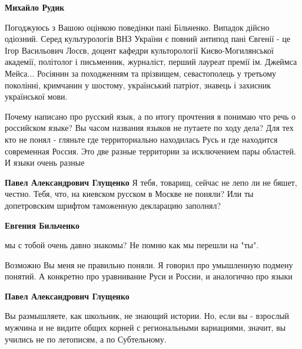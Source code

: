 \begin{itemize}
\begin{itemize}
\textbf{Михайло Рудик} 

Погоджуюсь з Вашою оцінкою поведінки пані Більченко. Випадок дійсно одіозний.
Серед культурологів ВНЗ України є повний антипод пані Євгенії - це Ігор
Васильович Лосєв, доцент кафедри культорології Києво-Могилянської академії,
політолог і письменник, журналіст, перший лауреат премії ім. Джеймса Мейса...
Росіянин за походженням та прізвищем, севастополець у третьому поколінні,
кримчанин у шостому, український патріот, знавець і захисник української мови.


\end{itemize}



Почему написано про русский язык, а по итогу прочтения я понимаю что речь о
российском языке? Вы часом названия языков не путаете по ходу дела? Для тех кто
не понял - гляньте где территориально находилась Русь и где находится
современная Россия. Это две разные территории за исключением пары областей. И
языки очень разные

\begin{itemize}


\textbf{Павел Александрович Глущенко} Я тебя, товарищ, сейчас не лепо ли не
бяшет, честно. Тебя, что, на киевском русском в Москве не поняли? Или ты
допетровским шрифтом таможенную декларацию заполнял?



\textbf{Евгения Бильченко} 

мы с тобой очень давно знакомы? Не помню как мы перешли на "ты".

Возможно Вы меня не правильно поняли. Я говорил про умышленную подмену понятий.
А конкретно про уравнивание Руси и России, и аналогично про языки



\textbf{Павел Александрович Глущенко} 

Вы размышляете, как школьник, не знающий
истории. Но, если вы - взрослый мужчина и не видите общих корней с
региональными вариациями, значит, вы учились не по летописям, а по Субтельному.


\end{itemize}
\end{itemize}
